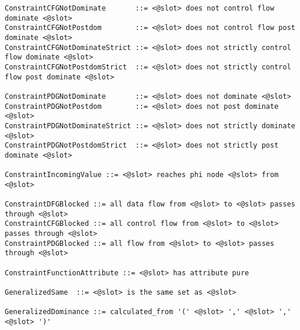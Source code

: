 \begin{lstlisting}[language={},basicstyle=\small\ttfamily,
                   numbers=none,framexleftmargin=0pt,xleftmargin=0pt,]
ConstraintCFGNotDominate       ::= <@slot> does not control flow dominate <@slot>
ConstraintCFGNotPostdom        ::= <@slot> does not control flow post dominate <@slot>
ConstraintCFGNotDominateStrict ::= <@slot> does not strictly control flow dominate <@slot>
ConstraintCFGNotPostdomStrict  ::= <@slot> does not strictly control flow post dominate <@slot>

ConstraintPDGNotDominate       ::= <@slot> does not dominate <@slot>
ConstraintPDGNotPostdom        ::= <@slot> does not post dominate <@slot>
ConstraintPDGNotDominateStrict ::= <@slot> does not strictly dominate <@slot>
ConstraintPDGNotPostdomStrict  ::= <@slot> does not strictly post dominate <@slot>

ConstraintIncomingValue ::= <@slot> reaches phi node <@slot> from <@slot>

ConstraintDFGBlocked ::= all data flow from <@slot> to <@slot> passes through <@slot>
ConstraintCFGBlocked ::= all control flow from <@slot> to <@slot> passes through <@slot>
ConstraintPDGBlocked ::= all flow from <@slot> to <@slot> passes through <@slot>

ConstraintFunctionAttribute ::= <@slot> has attribute pure

GeneralizedSame  ::= <@slot> is the same set as <@slot>

GeneralizedDominance ::= calculated_from '(' <@slot> ',' <@slot> ',' <@slot> ')'
\end{lstlisting}